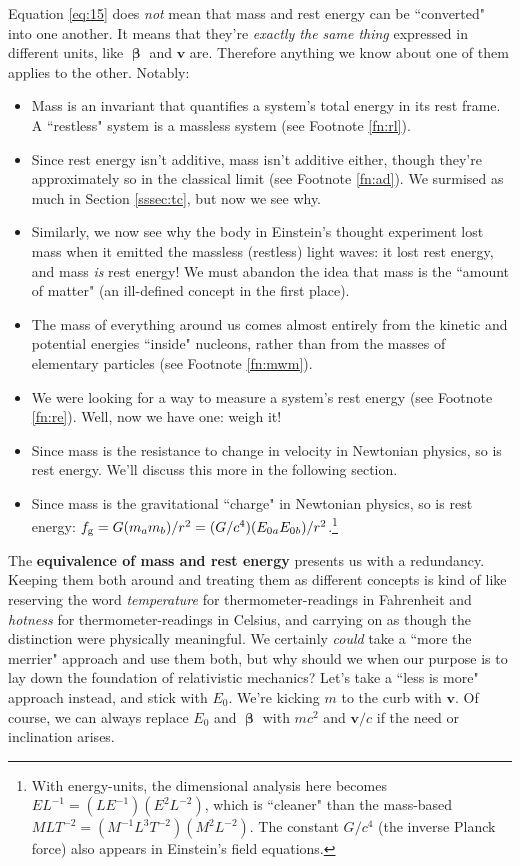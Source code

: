 \documentclass[12pt]{article}
\renewcommand{\vv}[1]{\mathbf{#1}}
\newcommand{\vvbeta}{\bm{\upbeta}}
\begin{document}
Equation \ref{eq:15} does \emph{not} mean that mass and rest energy can be ``converted" into one another. It means that they're \emph{exactly the same thing} expressed in different units, like $\vvbeta$ and $\vv v$ are. Therefore anything we know about one of them applies to the other. Notably:
\begin{itemize}
\item Mass is an invariant that quantifies a system's total energy in its rest frame. A ``restless" system is a massless system (see Footnote \ref{fn:rl}).
\item Since rest energy isn't additive, mass isn't additive either, though they're approximately so in the classical limit (see Footnote \ref{fn:ad}). We surmised as much in Section \ref{sssec:tc}, but now we see why.
\item Similarly, we now see why the body in Einstein's thought experiment lost mass when it emitted the massless (restless) light waves: it lost rest energy, and mass \emph{is} rest energy! We must abandon the idea that mass is the ``amount of matter" (an ill-defined concept in the first place).
\item The mass of everything around us comes almost entirely from the kinetic and potential energies ``inside" nucleons, rather than from the masses of elementary particles (see Footnote \ref{fn:mwm}).
\item We were looking for a way to measure a system's rest energy (see Footnote \ref{fn:re}). Well, now we have one: weigh it!
\item Since mass is the resistance to change in velocity in Newtonian physics, so is rest energy. We'll discuss this more in the following section.
\item Since mass is the gravitational ``charge" in Newtonian physics, so is rest energy: $f_{\mathrm{g}} = G(m_a m_b)/r^2 = (G/c^4)(E_{0 \mkern.5mu a} E_{0 \mkern.5mu b})/r^2$.\footnote{With energy-units, the dimensional analysis here becomes ${EL^{-1} = (LE^{-1}) (E^2 L^{-2})}$, which is ``cleaner" than the mass-based ${MLT^{-2} = (M^{-1}L^{3}T^{-2}) (M^2 L^{-2})}$. The constant $G / c^4$ (the inverse Planck force) also appears in Einstein's field equations.}
\end{itemize}

The \textbf{equivalence of mass and rest energy} presents us with a redundancy. Keeping them both around and treating them as different concepts is kind of like reserving the word \emph{temperature} for thermometer-readings in Fahrenheit and \emph{hotness} for thermometer-readings in Celsius, and carrying on as though the distinction were physically meaningful. We certainly \emph{could} take a ``more the merrier" approach and use them both, but why should we when our purpose is to lay down the foundation of relativistic mechanics? Let's take a ``less is more" approach instead, and stick with $E_0$. We're kicking $m$ to the curb with $\vv v$. Of course, we can always replace $E_0$ and $\vvbeta$ with $mc^2$ and $\vv v/c$ if the need or inclination arises.
\end{document}
